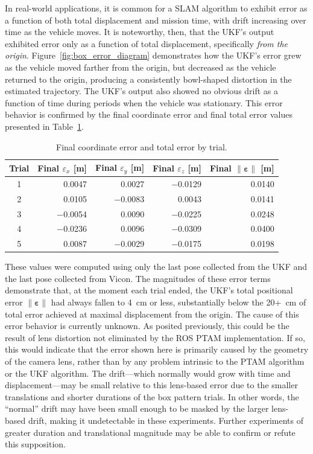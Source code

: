In real-world applications, it is common for a SLAM algorithm to exhibit error as a function of both total displacement and mission time, with drift increasing over time as the vehicle moves. It is noteworthy, then, that the UKF's output exhibited error only as a function of total displacement, specifically \textit{from the origin}. Figure~\ref{fig:box_error_diagram} demonstrates how the UKF's error grew as the vehicle moved farther from the origin, but decreased as the vehicle returned to the origin, producing a consistently bowl-shaped distortion in the estimated trajectory. The UKF's output also showed no obvious drift as a function of time during periods when the vehicle was stationary. This error behavior is confirmed by the final coordinate error and final total error values presented in Table~\ref{tab:final_err}. 

\begin{table}[h]\centering
\caption[Final Coordinate Error and Final Total Error]{Final coordinate error and total error by trial.}
\begin{tabular}[c]{crrrr}
\toprule
Trial & Final $\varepsilon_{x}$ [m] & Final $\varepsilon_{y}$ [m] & Final $\varepsilon_{z}$ [m] & Final $\| \bm{\varepsilon} \|$ [m] \\
\hline
1 & 0.0047 & 0.0027 & $-$0.0129 & 0.0140 \\
2 & 0.0105 & $-$0.0083 & 0.0043 & 0.0141 \\
3 & $-$0.0054 & 0.0090 & $-$0.0225 & 0.0248 \\
4 & $-$0.0236 & 0.0096 & $-$0.0309 & 0.0400 \\
5 & 0.0087 & $-$0.0029 & $-$0.0175 & 0.0198 \\
\bottomrule
\end{tabular}
\label{tab:final_err}
\end{table}

These values were computed using only the last pose collected from the UKF and the last pose collected from Vicon. The magnitudes of these error terms demonstrate that, at the moment each trial ended, the UKF's total positional error $\| \bm{\varepsilon} \|$ had always fallen to 4~cm or less, substantially below the 20+~cm of total error achieved at maximal displacement from the origin. The cause of this error behavior is currently unknown. As posited previously, this could be the result of lens distortion not eliminated by the ROS PTAM implementation. If so, this would indicate that the error shown here is primarily caused by the geometry of the camera lens, rather than by any problem intrinsic to the PTAM algorithm or the UKF algorithm. The drift---which normally would grow with time and displacement---may be small relative to this lens-based error due to the smaller translations and shorter durations of the box pattern trials. In other words, the ``normal'' drift may have been small enough to be masked by the larger lens-based drift, making it undetectable in these experiments. Further experiments of greater duration and translational magnitude may be able to confirm or refute this supposition.